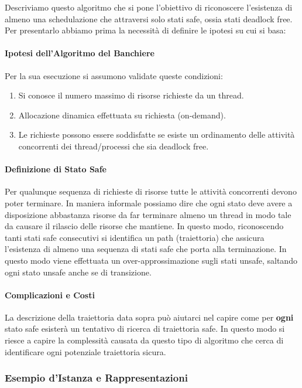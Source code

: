\documentclass{article}
\begin{document}
Descriviamo questo algoritmo che si pone l'obiettivo di riconoscere l'esistenza di almeno una schedulazione che attraversi solo stati safe, ossia stati deadlock free. Per
presentarlo abbiamo prima la necessità di definire le ipotesi su cui si basa:

\paragraph{Ipotesi dell'Algoritmo del Banchiere} Per la sua esecuzione si assumono validate queste condizioni:

\begin{enumerate}
    \item Si conosce il numero massimo di risorse richieste da un thread.
    \item Allocazione dinamica effettuata su richiesta (on-demand).
    \item Le richieste possono essere soddisfatte se esiste un ordinamento delle attività concorrenti dei thread/processi che sia deadlock free.
\end{enumerate}

\paragraph{Definizione di Stato Safe} Per qualunque sequenza di richieste di risorse tutte le attività concorrenti devono poter terminare. In maniera informale
possiamo dire che ogni stato deve avere a disposizione abbastanza risorse da far terminare almeno un thread in modo tale da causare il rilascio delle risorse che mantiene.
In questo modo, riconoscendo tanti stati safe consecutivi si identifica un path (traiettoria) che assicura l'esistenza di almeno una sequenza di stati safe che porta alla terminazione.
In questo modo viene effettuata un over-approssimazione sugli stati unsafe, saltando ogni stato unsafe anche se di transizione.

\paragraph{Complicazioni e Costi} La descrizione della traiettoria data sopra può aiutarci nel capire come per \textbf{ogni} stato safe esisterà
un tentativo di ricerca di traiettoria safe. In questo modo si riesce a capire la complessità causata da questo tipo di algoritmo che cerca di identificare ogni potenziale
traiettoria sicura.

\newpage

\subsubsection{Esempio d'Istanza e Rappresentazioni}
\end{document}
